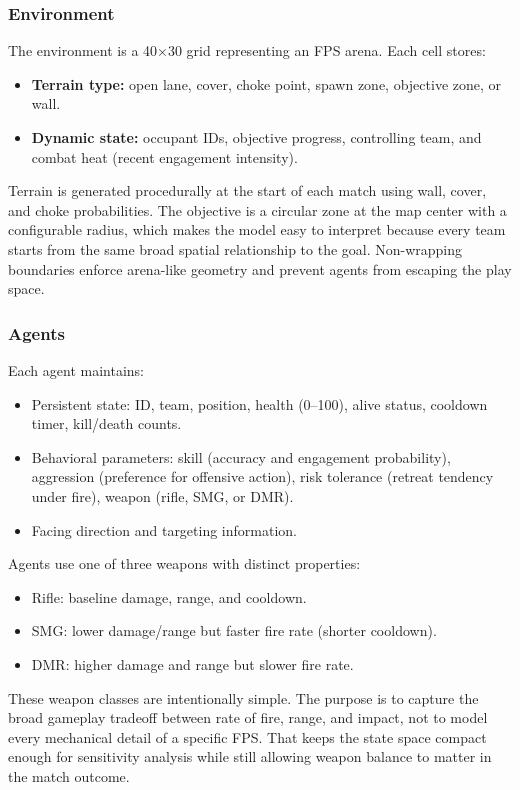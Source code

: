 \documentclass{assignment}
\begin{document}
\subsubsection{Environment}
The environment is a 40×30 grid representing an FPS arena. Each cell stores:
\begin{itemize}
  \item \textbf{Terrain type:} open lane, cover, choke point, spawn zone, objective zone, or wall.
  \item \textbf{Dynamic state:} occupant IDs, objective progress, controlling team, and combat heat (recent engagement intensity).
\end{itemize}

Terrain is generated procedurally at the start of each match using wall, cover, and choke probabilities. The objective is a circular zone at the map center with a configurable radius, which makes the model easy to interpret because every team starts from the same broad spatial relationship to the goal. Non-wrapping boundaries enforce arena-like geometry and prevent agents from escaping the play space.

\subsubsection{Agents}
Each agent maintains:
\begin{itemize}
  \item Persistent state: ID, team, position, health (0--100), alive status, cooldown timer, kill/death counts.
  \item Behavioral parameters: skill (accuracy and engagement probability), aggression (preference for offensive action), risk tolerance (retreat tendency under fire), weapon (rifle, SMG, or DMR).
  \item Facing direction and targeting information.
\end{itemize}

Agents use one of three weapons with distinct properties:
\begin{itemize}
  \item Rifle: baseline damage, range, and cooldown.
  \item SMG: lower damage/range but faster fire rate (shorter cooldown).
  \item DMR: higher damage and range but slower fire rate.
\end{itemize}

These weapon classes are intentionally simple. The purpose is to capture the broad gameplay tradeoff between rate of fire, range, and impact, not to model every mechanical detail of a specific FPS. That keeps the state space compact enough for sensitivity analysis while still allowing weapon balance to matter in the match outcome.
\end{document}
